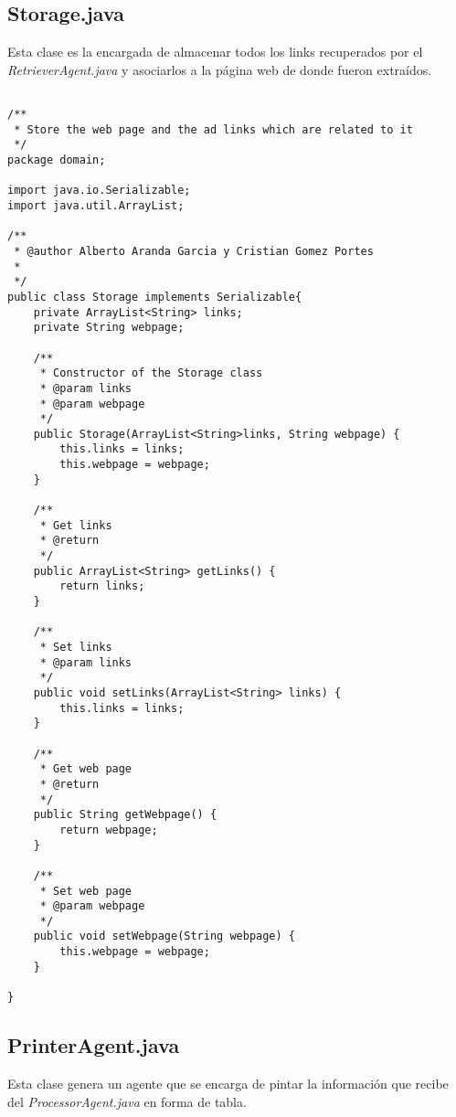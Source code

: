 \documentclass{pre-tfg}
\begin{document}
\subsection{Storage.java}

Esta clase es la encargada de almacenar todos los links recuperados por el \textit{RetrieverAgent.java} y asociarlos a la página web
de donde fueron extraídos.

\begin{lstlisting}[caption=Código que almacena los links junto a la página web de donde fueron recuperados,style=java]

/**
 * Store the web page and the ad links which are related to it
 */
package domain;

import java.io.Serializable;
import java.util.ArrayList;

/**
 * @author Alberto Aranda Garcia y Cristian Gomez Portes
 *
 */
public class Storage implements Serializable{
	private ArrayList<String> links;
	private String webpage;
	
	/**
	 * Constructor of the Storage class
	 * @param links
	 * @param webpage
	 */
	public Storage(ArrayList<String>links, String webpage) {
		this.links = links;
		this.webpage = webpage;
	}
	
	/**
	 * Get links
	 * @return
	 */
	public ArrayList<String> getLinks() {
		return links;
	}
	
	/**
	 * Set links
	 * @param links
	 */
	public void setLinks(ArrayList<String> links) {
		this.links = links;
	}
	
	/**
	 * Get web page
	 * @return
	 */
	public String getWebpage() {
		return webpage;
	}
	
	/**
	 * Set web page
	 * @param webpage
	 */
	public void setWebpage(String webpage) {
		this.webpage = webpage;
	}
	
}

\end{lstlisting}

\subsection{PrinterAgent.java}

Esta clase genera un agente que se encarga de pintar la información que recibe del \textit{ProcessorAgent.java} en forma de tabla.
\end{document}
